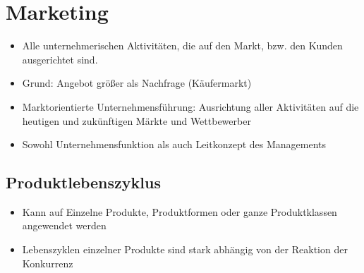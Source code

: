 \documentclass[titlepage,parskip=half]{scrartcl}
\let\Section\section
\renewcommand\section{\clearpage\Section}
\begin{document}
\section{Marketing}
\begin{itemize}
    \item Alle unternehmerischen Aktivitäten, die auf den Markt, bzw. den Kunden ausgerichtet sind.
    \item Grund: Angebot größer als Nachfrage (Käufermarkt)
    \item Marktorientierte Unternehmensführung: Ausrichtung aller Aktivitäten auf die heutigen und zukünftigen Märkte und Wettbewerber
    \item Sowohl Unternehmensfunktion als auch Leitkonzept des Managements
\end{itemize}

\subsection{Produktlebenszyklus}
\begin{itemize}
    \item Kann auf Einzelne Produkte, Produktformen oder ganze Produktklassen angewendet werden
    \item Lebenszyklen einzelner Produkte sind stark abhängig von der Reaktion der Konkurrenz
\end{itemize}
\end{document}

